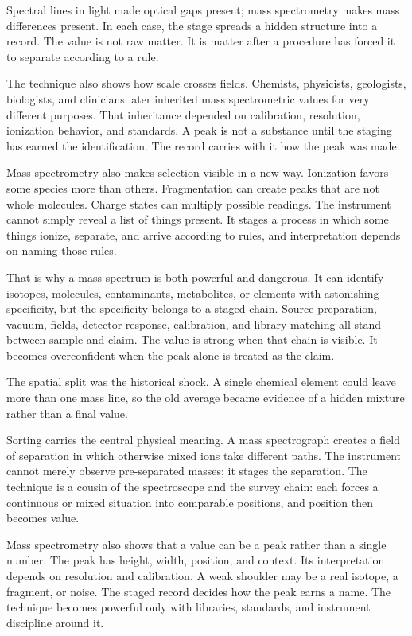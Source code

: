Spectral lines in light made optical gaps present; mass spectrometry makes
mass differences present. In each case, the stage spreads a hidden structure
into a record. The value is not raw matter. It is matter after a procedure
has forced it to separate according to a rule.

The technique also shows how scale crosses fields. Chemists, physicists,
geologists, biologists, and clinicians later inherited mass spectrometric
values for very different purposes. That inheritance depended on
calibration, resolution, ionization behavior, and standards. A peak is not a
substance until the staging has earned the identification. The record
carries with it how the peak was made.

Mass spectrometry also makes selection visible in a new way. Ionization
favors some species more than others. Fragmentation can create peaks that
are not whole molecules. Charge states can multiply possible readings. The
instrument cannot simply reveal a list of things present. It stages a
process in which some things ionize, separate, and arrive according to
rules, and interpretation depends on naming those rules.

That is why a mass spectrum is both powerful and dangerous. It can identify
isotopes, molecules, contaminants, metabolites, or elements with astonishing
specificity, but the specificity belongs to a staged chain. Source
preparation, vacuum, fields, detector response, calibration, and library
matching all stand between sample and claim. The value is strong when that
chain is visible. It becomes overconfident when the peak alone is treated as the claim.

The spatial split was the historical shock. A single chemical element could
leave more than one mass line, so the old average became evidence of a
hidden mixture rather than a final value.

Sorting carries the central physical meaning. A mass spectrograph creates a
field of separation in which otherwise mixed ions take different paths. The
instrument cannot merely observe pre-separated masses; it stages the
separation. The technique is a cousin of the spectroscope and the survey
chain: each forces a continuous or mixed situation into comparable
positions, and position then becomes value.

Mass spectrometry also shows that a value can be a peak rather than a
single number. The peak has height, width, position, and context. Its
interpretation depends on resolution and calibration. A weak shoulder may
be a real isotope, a fragment, or noise. The staged record decides how the
peak earns a name. The technique becomes powerful only with libraries,
standards, and instrument discipline around it.

